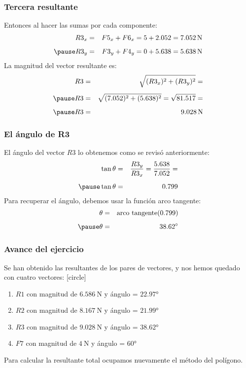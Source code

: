 \documentclass[14pt, xcolor={usenames,dvipsnames}]{beamer}
\begin{document}
\begin{frame}
\frametitle{Tercera resultante}
Entonces al hacer las sumas por cada componente:
\begin{eqnarray*}
R3_{x} &=& F5_{x} + F6_{x} = 5 + 2.052 = \SI{7.052}{\newton} \\[0.5em] \pause
R3_{y} &=& F3_{y} + F4_{y} = 0 + 5.638 = \SI{5.638}{\newton}
\end{eqnarray*}
\pause
La magnitud del vector resultante es:
\begin{eqnarray*}
R3 &=& \sqrt{(R3_{x})^{2} + (R3_{y})^{2}} = \\[0.5em] \pause
R3 &=& \sqrt{(7.052)^{2} + (5.638)^{2}} = \sqrt{81.517} = \\[0.5em] \pause
R3 &=& \SI{9.028}{\newton}
\end{eqnarray*}
\end{frame}
\begin{frame}
\frametitle{El ángulo de R3}
El ángulo del vector $R3$ lo obtenemos como se revisó anteriormente:
\begin{eqnarray*}
\tan \theta &=& \dfrac{R3_{y}}{R3_{x}} = \dfrac{5.638}{7.052} = \\[0.5em] \pause
\tan \theta &=& 0.799
\end{eqnarray*}
\pause
Para recuperar el ángulo, debemos usar la función arco tangente:
\begin{eqnarray*}
\theta &=& \text{arco tangente} (0.799) \\[0.5em] \pause
\theta &=& \ang{38.62}
\end{eqnarray*}
\end{frame}
\begin{frame}
\frametitle{Avance del ejercicio}
Se han obtenido las resultantes de los pares de vectores, y nos hemos quedado con cuatro vectores:
[circle]
\begin{enumerate}[<+->]
\item $R1$ con magnitud de $\SI{6.586}{\newton}$ y ángulo = $\ang{22.97}$
\item $R2$ con magnitud de $\SI{8.167}{\newton}$ y ángulo = $\ang{21.99}$
\item $R3$ con magnitud de $\SI{9.028}{\newton}$ y ángulo = $\ang{38.62}$
\item $F7$ con magnitud de $\SI{4}{\newton}$ y ángulo = $\ang{60}$
\end{enumerate}
\pause
Para calcular la resultante total ocupamos nuevamente el método del polígono.
\end{frame}
\end{document}
